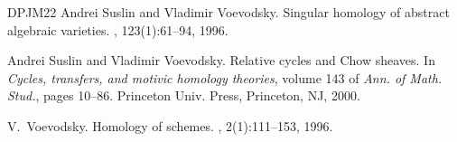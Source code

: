 \documentclass[12pt,leqno]{article}
\begin{document}
\begin{thebibliography}{DPJM22}
Andrei Suslin and Vladimir Voevodsky.
\newblock Singular homology of abstract algebraic varieties.
, 123(1):61--94, 1996.

Andrei Suslin and Vladimir Voevodsky.
\newblock Relative cycles and {C}how sheaves.
\newblock In {\em Cycles, transfers, and motivic homology theories}, volume 143
  of {\em Ann. of Math. Stud.}, pages 10--86. Princeton Univ. Press, Princeton,
  NJ, 2000.

V.~Voevodsky.
\newblock Homology of schemes.
, 2(1):111--153, 1996.

\end{thebibliography}

%
%
%
%
\end{document}
